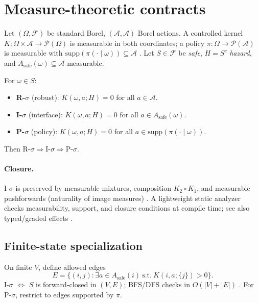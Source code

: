 \documentclass[11pt]{article}
\newcommand{\supp}{\mathrm{supp}}
\newcommand{\1}{\mathbbm{1}}
\newcommand{\F}{\mathcal{F}}
\newcommand{\A}{\mathcal{A}}
\newcommand{\Pcal}{\mathcal{P}}
\begin{document}
\section{Measure-theoretic contracts}\label{sec:contracts}
Let $(\Omega,\F)$ be standard Borel, $(\A,\mathcal{A})$ Borel actions. A controlled kernel $K:\Omega\times\A\to \Pcal(\Omega)$ is measurable in both coordinates; a policy $\pi:\Omega\to \Pcal(\A)$ is measurable with $\supp(\pi(\cdot\mid \omega))\subseteq \A$ \parencite{Bogachev2007,AliprantisBorder2006,MeynTweedie2009}. Let $S\in\F$ be \emph{safe}, $H=S^c$ \emph{hazard}, and $A_{\text{safe}}(\omega)\subseteq \A$ measurable.

\begin{definition}
For $\omega\in S$:
\begin{itemize}[leftmargin=1.1em]
\item \textbf{R-$\sigma$} (robust): $K(\omega,a;H)=0$ for all $a\in\A$.
\item \textbf{I-$\sigma$} (interface): $K(\omega,a;H)=0$ for all $a\in A_{\text{safe}}(\omega)$.
\item \textbf{P-$\sigma$} (policy): $K(\omega,a;H)=0$ for all $a\in \supp(\pi(\cdot\mid\omega))$.
\end{itemize}
Then $\text{R-}\sigma\Rightarrow \text{I-}\sigma\Rightarrow \text{P-}\sigma$.
\end{definition}

\paragraph{Closure.}
I-$\sigma$ is preserved by measurable mixtures, composition $K_2\circ K_1$, and measurable pushforwards (naturality of image measures) \parencite{Bogachev2007}. A lightweight static analyzer checks measurability, support, and closure conditions at compile time; see also typed/graded effects \parencite{elliott2025contracts,elliott2025graded}.

\subsection{Finite-state specialization}\label{sec:finite}
On finite $V$, define allowed edges
\[
E=\{(i,j): \exists a\in A_{\text{safe}}(i)\ \text{s.t.}\ K(i,a;\{j\})>0\}.
\]
I-$\sigma$ $\iff$ $S$ is forward-closed in $(V,E)$; BFS/DFS checks in $O(|V|+|E|)$ \parencite[Ch.~22]{Cormen2009}. For P-$\sigma$, restrict to edges supported by $\pi$.
\end{document}
